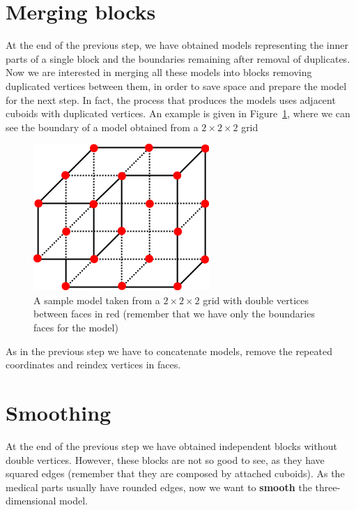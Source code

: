 \section{Merging blocks}\label{sec33:Blocks}

At the end of the previous step, we have obtained models representing the inner parts of a single block and the boundaries remaining after removal of duplicates. Now we are interested in merging all these models into blocks removing duplicated vertices between them, in order to save space and prepare the model for the next step. In fact, the process that produces the models uses adjacent cuboids with duplicated vertices. An example is given in Figure~\ref{fig:duplicates}, where we can see the boundary of a model obtained from a $2 \times 2 \times 2$ grid

\begin{figure}[htb] %
   \centering
   \includegraphics[width=0.25\linewidth]{images/duplicates.png}
   \caption[Sample model with double vertices]{A sample model taken from a $2 \times 2 \times 2$ grid with double vertices between faces in red (remember that we have only the boundaries faces for the model)}
   \label{fig:duplicates}
\end{figure}

As in the previous step we have to concatenate models, remove the repeated coordinates and reindex vertices in faces.

\section{Smoothing}\label{sec33:Smoothing}

At the end of the previous step we have obtained independent blocks without double vertices. However, these blocks are not so good to see, as they have squared edges (remember that they are composed by attached cuboids). As the medical parts usually have rounded edges, now we want to \textbf{smooth} the three-dimensional model.\\

